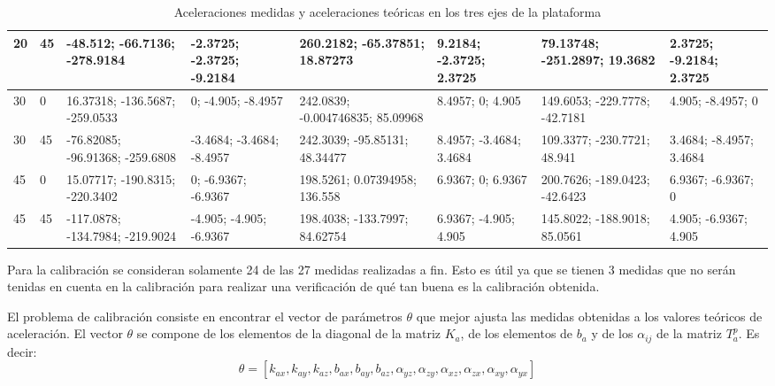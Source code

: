 \documentclass[main]{subfiles}
\begin{document}
\begin{table}[H]
\begin{tiny}
\begin{tabular}{p{30pt}p{30pt}|p{40pt}|p{26pt}|p{40pt}|p{26pt}|p{40pt}|p{26pt}|}
\multicolumn{1}{|p{30pt}|}{20} & 45 &   -48.512;     -66.7136;    -278.9184 & -2.3725;    -2.3725;    -9.2184 & 260.2182;       -65.37851;     18.87273 & 9.2184;    -2.3725;    2.3725 & 79.13748;    -251.2897;     19.3682 & 2.3725;    -9.2184;    2.3725\\ \hline
\multicolumn{1}{|p{30pt}|}{30} & 0  &  16.37318;    -136.5687;    -259.0533 &       0;     -4.905;    -8.4957 & 242.0839;    -0.004746835;     85.09968 & 8.4957;          0;     4.905 & 149.6053;    -229.7778;    -42.7181 &  4.905;    -8.4957;         0\\ \hline
\multicolumn{1}{|p{30pt}|}{30} & 45 & -76.82085;    -96.91368;    -259.6808 & -3.4684;    -3.4684;    -8.4957 & 242.3039;       -95.85131;     48.34477 & 8.4957;    -3.4684;    3.4684 & 109.3377;    -230.7721;      48.941 & 3.4684;    -8.4957;    3.4684\\ \hline
\multicolumn{1}{|p{30pt}|}{45} & 0  &  15.07717;    -190.8315;    -220.3402 &       0;    -6.9367;    -6.9367 & 198.5261;      0.07394958;      136.558 & 6.9367;          0;    6.9367 & 200.7626;    -189.0423;    -42.6423 & 6.9367;    -6.9367;         0\\ \hline
\multicolumn{1}{|p{30pt}|}{45} & 45 & -117.0878;    -134.7984;    -219.9024 &  -4.905;     -4.905;    -6.9367 & 198.4038;       -133.7997;     84.62754 & 6.9367;     -4.905;     4.905 & 145.8022;    -188.9018;     85.0561 &  4.905;    -6.9367;     4.905\\ \hline


\end{tabular}
\caption{Aceleraciones medidas y aceleraciones teóricas en los tres ejes de la plataforma}
\label{tab:acc}
\end{tiny}
\end{table} 

Para la calibración se consideran solamente 24 de las 27 medidas realizadas a fin. Esto es útil ya que se tienen 3 medidas que no serán tenidas en cuenta en la calibración para realizar una verificación de qué tan buena es la calibración obtenida.

El problema de calibración consiste en encontrar el vector de parámetros $\theta$ que mejor ajusta las medidas obtenidas a los valores teóricos de aceleración. El vector $\theta$ se compone de los elementos de la diagonal de la matriz $K_a$, de los elementos de $b_a$ y de los $\alpha_{ij}$ de la matriz $T_a^p$. Es decir: $$\theta =\left[ k_{ax} , k_{ay} , k_{az} ,b_{ax} ,b_{ay} ,b_{az}, \alpha_{yz} , \alpha_{zy} , \alpha_{xz} , \alpha_{zx} , \alpha_{xy} , \alpha_{yx} \right]$$
\end{document}
